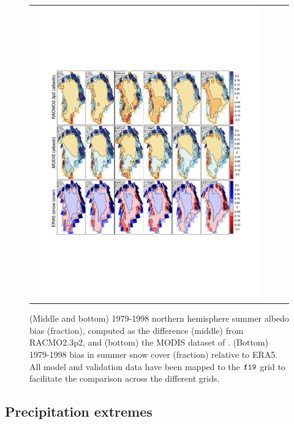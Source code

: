 \documentclass[draft]{agujournal2019}
\begin{document}
\begin{figure}[t]
\begin{center}
\begin{tabular}{cccc}
         \includegraphics[width=130mm]{temp_contours_diffALB.pdf}
\end{tabular}
\end{center}
\caption{(Middle and bottom) 1979-1998 northern hemisphere summer albedo bias (fraction), computed as the difference (middle) from RACMO2.3p2, and (bottom) the MODIS dataset of . (Bottom) 1979-1998 bias in summer snow cover (fraction) relative to ERA5. All model and validation data have been mapped to the $\tt f19$ grid to facilitate the comparison across the different grids.}
\label{fig:alb}
\end{figure}

\subsection{Precipitation extremes}
\end{document}
